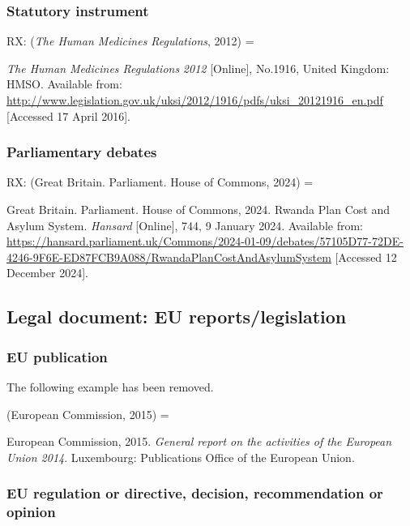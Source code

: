 \subsubsection*{Statutory instrument}

RX: (\emph{The Human Medicines Regulations}, 2012) = \cite{gb.hmr2012}

\emph{The Human Medicines Regulations} \emph{2012} [Online], No.1916, United Kingdom: HMSO. Available from: \url{http://www.legislation.gov.uk/uksi/2012/1916/pdfs/uksi_20121916_en.pdf} [Accessed 17 April 2016].




\subsubsection*{Parliamentary debates}

RX: (Great Britain. Parliament. House of Commons, 2024) = \cite{gb.hc2024rpc}

Great Britain. Parliament. House of Commons, 2024. Rwanda Plan Cost and Asylum System. \emph{Hansard} [Online], 744, 9 January 2024. Available from: \url{https://hansard.parliament.uk/Commons/2024-01-09/debates/57105D77-72DE-4246-9F6E-ED87FCB9A088/RwandaPlanCostAndAsylumSystem} [Accessed 12 December 2024].



\subsection{Legal document: EU reports\slash legislation}


\subsubsection*{EU publication}

The following example has been removed.

(European Commission, 2015) = \cite{ec2015gra}

European Commission, 2015. \emph{General report on the activities of the European Union 2014}. Luxembourg: Publications Office of the European Union.




\subsubsection*{EU regulation or directive, decision, recommendation or opinion}

